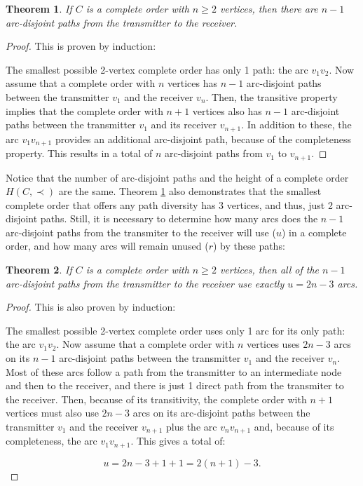 \documentclass[5p,twocolumn]{elsarticle}
\newtheorem{theorem}{Theorem}
\begin{document}
\begin{theorem}\label{T:Num2}
If $C$ is a complete order with $n\geq2$ vertices, then there are $n-1$ arc-disjoint paths from the transmitter to the receiver.
\end{theorem}

\begin{proof}
This is proven by induction:

The smallest possible 2-vertex complete order has only 1 path: the arc $v_{1}v_2$. Now assume that a complete order with $n$ vertices has $n-1$ arc-disjoint paths between the transmitter $v_1$ and the receiver $v_n$. Then, the transitive property implies that the complete order with $n+1$ vertices also has $n-1$ arc-disjoint paths between the transmitter $v_1$ and its receiver $v_{n+1}$. In addition to these, the arc $v_{1}v_{n+1}$ provides an additional arc-disjoint path, because of the completeness property. This results in a total of $n$ arc-disjoint paths from $v_1$ to $v_{n+1}$.
\end{proof}

Notice that the number of arc-disjoint paths and the height of a complete order $H(C,\prec)$ are the same. Theorem \ref{T:Num2} also demonstrates that the smallest complete order that offers any path diversity has 3 vertices, and thus, just 2 arc-disjoint paths. Still, it is necessary to determine how many arcs does the  $n-1$ arc-disjoint paths from the transmiter to the receiver will use ($u$) in a complete order, and how many arcs will remain unused ($r$) by these paths:

\begin{theorem}\label{T:Num3}
If $C$ is a complete order with $n\geq2$ vertices, then all of the $n-1$ arc-disjoint paths from the transmitter to the receiver use exactly $u=2n-3$ arcs.
\end{theorem}

\begin{proof}
This is also proven by induction:

The smallest possible 2-vertex complete order uses only 1 arc for its only path: the arc $v_{1}v_2$. Now assume that a complete order with $n$ vertices uses $2n-3$ arcs on its $n-1$ arc-disjoint paths between the transmitter $v_1$ and the receiver $v_n$. Most of these arcs follow a path from the transmitter to an intermediate node and then to the receiver, and there is just 1 direct path from the transmiter to the receiver. Then, because of its transitivity, the complete order with $n+1$ vertices must also use $2n-3$ arcs on its arc-disjoint paths between the transmitter $v_1$ and the receiver $v_{n+1}$ plus the arc $v_{n}v_{n+1}$ and, because of its completeness, the arc $v_{1}v_{n+1}$. This gives a total of:

\[
u = 2n-3+1+1 = 2(n+1)-3.
\]
\end{proof}
\end{document}
